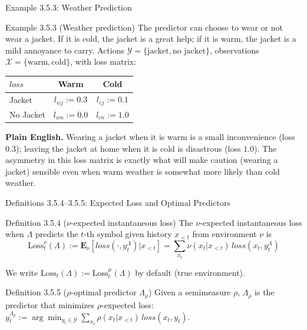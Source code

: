 \documentclass[aspectratio=169,10pt]{beamer}
\newcommand{\X}{\mathcal{X}}
\newcommand{\Loss}{\mathrm{Loss}}
\newcommand{\loss}{\mathit{loss}}
\begin{document}
\begin{frame}{Example 3.5.3: Weather Prediction}
  \begin{block}{Example 3.5.3 (Weather prediction)}
    The predictor can choose to wear or not wear a jacket. If it is cold, the
    jacket is a great help; if it is warm, the jacket is a mild annoyance to
    carry. Actions $\mathcal{Y}=\{\text{jacket},\text{no jacket}\}$,
    observations $\X=\{\text{warm},\text{cold}\}$, with loss matrix:
  \end{block}
  \begin{center}
  \begin{tabular}{l|c|c}
    $\loss$ & Warm & Cold \\ \hline
    Jacket & $l_{wj}:=0.3$ & $l_{cj}:=0.1$ \\
    No Jacket & $l_{wn}:=0.0$ & $l_{cn}:=1.0$
  \end{tabular}
  \end{center}
  \textbf{Plain English.} Wearing a jacket when it is warm is a small
  inconvenience (loss $0.3$); leaving the jacket at home when it is cold is
  disastrous (loss $1.0$). The asymmetry in this loss matrix is exactly what
  will make caution (wearing a jacket) sensible even when warm weather is
  somewhat more likely than cold weather.
\end{frame}

\begin{frame}{Definitions 3.5.4--3.5.5: Expected Loss and Optimal Predictors}
  \begin{block}{Definition 3.5.4 ($\nu$-expected instantaneous loss)}
    The $\nu$-expected instantaneous loss when $\Lambda$ predicts the $t$-th
    symbol given history $x_{<t}$ from environment $\nu$ is
    \[
      \Loss_t^\nu(\Lambda) := \mathbf{E}_\nu[\loss(\cdot,y_t^\Lambda)|x_{<t}]
      = \sum_{x_t} \nu(x_t|x_{<t})\,\loss(x_t,y_t^\Lambda)
    \]
  \end{block}
  We write $\Loss_t(\Lambda):=\Loss_t^\mu(\Lambda)$ by default (true environment).
  \begin{block}{Definition 3.5.5 ($\rho$-optimal predictor $\Lambda_\rho$)}
    Given a semimeasure $\rho$, $\Lambda_\rho$ is the predictor that minimizes
    $\rho$-expected loss: $y_t^{\Lambda_\rho} := \arg\min_{y_t\in\mathcal{Y}}
    \sum_{x_t}\rho(x_t|x_{<t})\,\loss(x_t,y_t)$.
  \end{block}
\end{frame}
\end{document}
